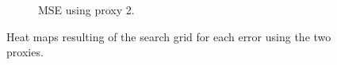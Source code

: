 \documentclass[11pt,a4paper,oneside]{book}
\begin{document}
\begin{figure}[!h]
{\begin{subfigure}{.55\linewidth}
  \caption{MSE using proxy 2.}
  \label{fig:heat2}
\end{subfigure}}
\caption{Heat maps resulting of the search grid for each error using the two proxies.}
\label{fig:heat6m}
\end{figure}
\end{document}

